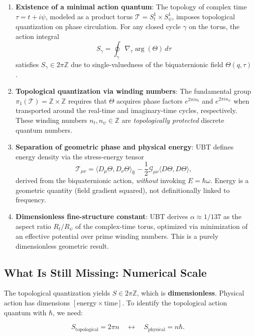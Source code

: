 \documentclass[12pt]{article}
\begin{document}
\begin{enumerate}
\item \textbf{Existence of a minimal action quantum}: The topology of complex time $\tau = t + i\psi$, modeled as a product torus $\mathcal{T} = S^1_t \times S^1_\psi$, imposes topological quantization on phase circulation. For any closed cycle $\gamma$ on the torus, the action integral
\[
S_\gamma = \oint_\gamma \nabla_\tau \arg(\Theta) \, d\tau
\]
satisfies $S_\gamma \in 2\pi \mathbb{Z}$ due to single-valuedness of the biquaternionic field $\Theta(q,\tau)$.

\item \textbf{Topological quantization via winding numbers}: The fundamental group $\pi_1(\mathcal{T}) = \mathbb{Z} \times \mathbb{Z}$ requires that $\Theta$ acquires phase factors $e^{2\pi i n_t}$ and $e^{2\pi i n_\psi}$ when transported around the real-time and imaginary-time cycles, respectively. These winding numbers $n_t, n_\psi \in \mathbb{Z}$ are \emph{topologically protected} discrete quantum numbers.

\item \textbf{Separation of geometric phase and physical energy}: UBT defines energy density via the stress-energy tensor
\[
\mathcal{T}_{\mu\nu} = \langle D_\mu \Theta, D_\nu \Theta \rangle_\mathbb{B} - \frac{1}{2} \mathcal{G}_{\mu\nu} \langle D\Theta, D\Theta \rangle,
\]
derived from the biquaternionic action, \emph{without} invoking $E = \hbar\omega$. Energy is a geometric quantity (field gradient squared), not definitionally linked to frequency.

\item \textbf{Dimensionless fine-structure constant}: UBT derives $\alpha \approx 1/137$ as the aspect ratio $R_t/R_\psi$ of the complex-time torus, optimized via minimization of an effective potential over prime winding numbers. This is a purely dimensionless geometric result.
\end{enumerate}

\subsection{What Is Still Missing: Numerical Scale}

The topological quantization yields $S \in 2\pi \mathbb{Z}$, which is \textbf{dimensionless}. Physical action has dimensions $[\text{energy} \times \text{time}]$. To identify the topological action quantum with $\hbar$, we need:

\[
S_{\text{topological}} = 2\pi n \quad \longleftrightarrow \quad S_{\text{physical}} = n \hbar.
\]
\end{document}
